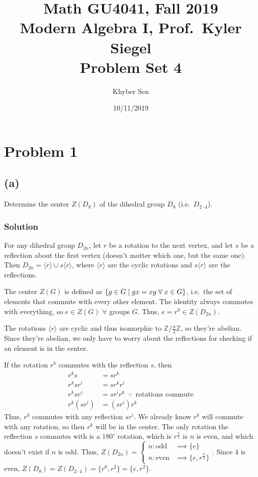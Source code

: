 \documentclass[fleqn]{article}
\title{
Math GU4041, Fall 2019 \\
Modern Algebra I, Prof.\ Kyler Siegel \\
Problem Set 4
}
\author{Khyber Sen}
\date{10/11/2019}
\begin{document}
    
    \maketitle
    
    \section{Problem 1}
        
        \subsection{(a)}
        Determine the center $Z(D_8)$ of the dihedral group $D_8$ (i.e.\ $D_{2 \cdot 4}$).
            
            \subsubsection{Solution}
            For any dihedral group $D_{2n}$, let $r$ be a rotation to the next vertex, and let $s$ be a reflection about the first vertex (doesn't matter which one, but the same one).  Then $D_{2n} = \langle r \rangle \cup s \langle r \rangle$, where $\langle r \rangle$ are the cyclic rotations and $s \langle r \rangle$ are the reflections.
            
            The center $Z(G)$ is defined as $\{g \in G \mid gx = xg \thickspace \forall \thickspace x \in G\}$, i.e.\ the set of elements that commute with every other element.  The identity always commutes with everything, so $e \in Z(G)$ $\forall$ groups $G$.  Thus, $e = r^0 \in Z(D_{2n})$.
            
            The rotations $\langle r \rangle$ are cyclic and thus isomorphic to $\mathbb{Z}/\frac{n}{2}\mathbb{Z}$, so they're abelian.  Since they're abelian, we only have to worry about the reflections for checking if an element is in the center.  
            
            If the rotation $r^k$ commutes with the reflection $s$, then
            \begin{align}
                r^k s &= s r^k \\
                r^k s r^i &= s r^k r^i \\
                r^k s r^i &= s r^i r^k \enspace \because{} \enspace \text{rotations commute} \\
                r^k (s r^i) &= (s r^i) r^k
            \end{align}
            Thus, $r^k$ commutes with any reflection $sr^i$.  We already know $r^k$ will commute with any rotation, so then $r^k$ will be in the center.  The only rotation the reflection $s$ commutes with is a $180^{\circ}$ rotation, which is $r^{\frac{n}{2}}$ is $n$ is even, and which doesn't exist if $n$ is odd.  Thus, $Z(D_{2n}) = \begin{cases}
                n : \text{odd} &\implies \{e\} \\
                n : \text{even} &\implies \{e, r^{\frac{n}{2}}\}
            \end{cases}$.  Since 4 is even, $Z(D_8) = Z(D_{2 \cdot 4}) = \{r^0, r^2\} = \{e, r^2\}$.
        
\end{document}
